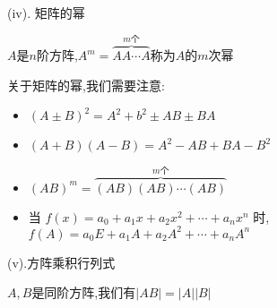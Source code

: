 \begin{definition}[矩阵的定义和运算]
	(iv). 矩阵的幂
	
	$A$是$n$阶方阵,$A^{m}=\overbrace{AA\cdots A}^{m\text{个}}$称为$A$的$m$次幂
	
	关于矩阵的幂,我们需要注意:  
	\begin{itemize}
		\item $(A\pm B)^2=A^2+b^2\pm AB \pm BA$
		\item $(A+B)(A-B)=A^2-AB+BA-B^2$
		\item $(AB)^m=\overbrace{(AB)(AB)\cdots(AB)}^{m\text{个}}$
		\item 当 $f(x)=a_{0}+a_{1}x+a_{2}x^2+\cdots+a_{n}x^{n}$ 时,$f(A)=a_{0}E+a_{1}A+a_{2}A^2+\cdots+a_{n}A^n$
	\end{itemize}
	
	(v).方阵乘积行列式
	
	$A,B$是同阶方阵,我们有$|AB|=|A||B|$
\end{definition}

